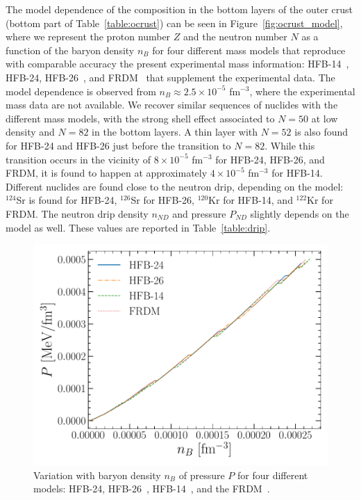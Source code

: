 The model dependence of the composition in the bottom layers of the outer crust 
(bottom part of Table~\ref{table:ocrust}) can be seen in
Figure~\ref{fig:ocrust_model}, where we represent the proton number $Z$ and the
neutron number $N$ as a function of the baryon density $n_B$ for four different
mass models that reproduce with comparable accuracy the present experimental
mass information: HFB-14~\cite{Goriely2007}, HFB-24, HFB-26~\cite{Goriely2013}, 
and FRDM~\cite{Moller1995} that supplement the experimental data. The model
dependence is observed from $n_B \approx 2.5\times 10^{-5}$ fm$^{-3}$, where
the experimental mass data are not available. We 
recover similar sequences of nuclides with the different mass models, with
the strong shell effect associated to $N=50$ at low density and $N=82$ in the
bottom layers. A thin layer with $N=52$ is also found for HFB-24 and HFB-26 just before the
transition to $N=82$. While this transition occurs in the vicinity of $8\times
10^{-5}$ fm$^{-3}$ for HFB-24, HFB-26, and FRDM, it is found to happen at
approximately $4\times 10^{-5}$ fm$^{-3}$ for HFB-14. Different nuclides are 
found close to the neutron drip, depending on the model: $^{124}$Sr is found for
HFB-24, $^{126}$Sr for HFB-26, $^{120}$Kr for HFB-14, and $^{122}$Kr for FRDM. 
The neutron drip density $n_{ND}$ and pressure $P_{ND}$ slightly depends on 
the model as well. These values are reported in Table~\ref{table:drip}.

\begin{figure}[!t]
\begin{center}
  \includegraphics[width=0.8\linewidth]{figures/ocrust_pres.pdf}
\end{center}
\caption[Pressure versus baryon density in the outer crust]{Variation with 
  baryon density $n_B$ of pressure $P$ for four different models: HFB-24, 
  HFB-26~\cite{Goriely2013}, HFB-14~\cite{Goriely2007}, and the 
FRDM~\cite{Moller1995}.}\label{fig:ocrust_pres}
\end{figure}

